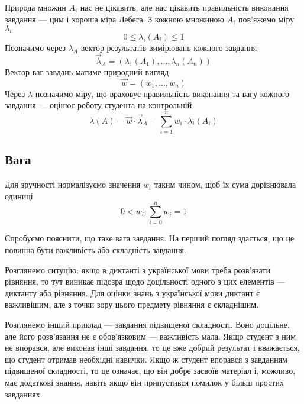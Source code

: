 Природа множин $A_i$ нас не цікавить, але нас цікавить правильність виконання
завдання --- цим і хороша міра Лебега.
З кожною множиною $A_i$ пов’яжемо міру $\lambda_i$
\begin{equation*}
  0 \le \lambda_i\left( A_i \right) \le 1
\end{equation*}
Позначимо через $\lambda_A$ вектор результатів вимірювань кожного завдання
\begin{equation*}
  \vec{\lambda}_A
  = \left( \lambda_1\left( A_1 \right), \dots,
    \lambda_n\left( A_n \right) \right)
\end{equation*}
Вектор ваг завдань матиме природний вигляд
\begin{equation*}
  \vec{w} = \left( w_1, \dots, w_n \right)
\end{equation*}
Через $\lambda$ позначимо міру, що враховує правильність виконання та вагу
кожного завдання --- оцінює роботу студента на контрольній
\begin{equation}\label{eq:measuresAndWeights}
  \lambda\left( A \right)
  = \vec{w} \cdot \vec{\lambda}_A
  = \sum_{i=1}^{n} w_i \cdot \lambda_i\left( A_i \right)
\end{equation}

\subsection{Вага}
\label{subsec:weight}

Для зручності нормалізуємо значення $w_i$ таким чином, щоб їх сума дорівнювала
одиниці
\begin{equation*}
  0 < w_i: \sum_{i=0}^{n} w_i = 1
\end{equation*}

Спробуємо пояснити, що таке вага завдання.
На перший погляд здається, що це повинна бути важливість або складність
завдання.

Розглянемо ситуцію: якщо в диктанті з української мови треба розв’язати
рівняння, то тут виникає підозра щодо доцільності одного з цих елементів ---
диктанту або рівняння.
Для оцінки знань з української мови диктант є важливішим, але з точки зору
цього предмету рівняння є складнішим.

Розглянемо інший приклад --- завдання підвищеної складності.
Воно доцільне, але його розв’язання не є обов’язковим --- важливість мала.
Якщо студент з ним не впорався, але виконав інші завдання, то це вже добрий
результат і вважається, що студент отримав необхідні навички.
Якщо ж студент впорався з завданням підвищеної складності, то це означає, що
він добре засвоїв матеріал і, можливо, має додаткові знання, навіть якщо він
припустився помилок у більш простих завданнях.

